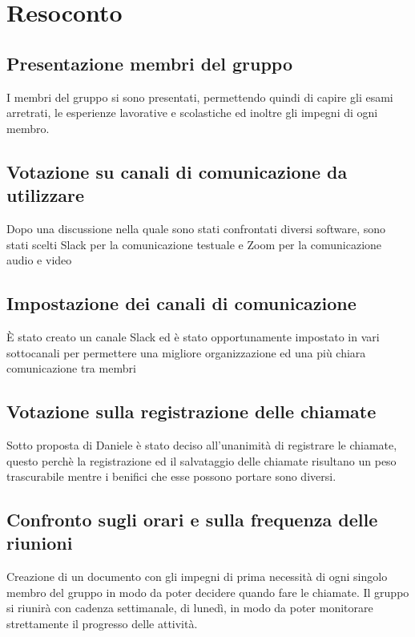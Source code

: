 \section{Resoconto}

\subsection{Presentazione membri del gruppo}

I membri del gruppo si sono presentati, permettendo quindi di capire gli esami arretrati, le esperienze lavorative e scolastiche ed inoltre gli impegni di ogni membro.

\subsection{Votazione su canali di comunicazione da utilizzare}

Dopo una discussione nella quale sono stati confrontati diversi software, sono stati scelti Slack per la comunicazione testuale e Zoom per la comunicazione audio e video

\subsection{Impostazione dei canali di comunicazione}

È stato creato un canale Slack ed è stato opportunamente impostato in vari sottocanali per permettere una migliore organizzazione ed una più chiara comunicazione tra membri

\subsection{Votazione sulla registrazione delle chiamate}

Sotto proposta di Daniele è stato deciso all’unanimità di registrare le chiamate, questo perchè la registrazione ed il salvataggio delle chiamate risultano un peso trascurabile mentre i benifici che esse possono portare sono diversi.

\subsection{Confronto sugli orari e sulla frequenza delle riunioni}

Creazione di un documento con gli impegni di prima necessità di ogni singolo membro del gruppo in modo da poter decidere quando fare le chiamate. Il gruppo si riunirà con cadenza settimanale, di lunedì, in modo da poter monitorare strettamente il progresso delle attività.


